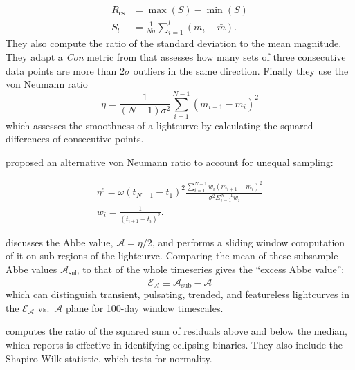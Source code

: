 \documentclass[DM,authoryear,toc]{lsstdoc}
\begin{document}
\begin{equation}
\begin{aligned} R_{\mathrm{cs}} &=\max (S)-\min (S) \\ S_{l} &=\frac{1}{N \sigma} \sum_{i=1}^{l}\left(m_{i}-\bar{m}\right). \end{aligned}
\end{equation}
They also compute the ratio of the standard deviation to the mean magnitude.
They adapt a \textit{Con} metric from \citet{Wozniak:00:Difference-Imag} that assesses how many sets of three consecutive data points are more than 2$\sigma$ outliers in the same direction.
Finally they use the von Neumann ratio
\begin{equation}
\eta=\frac{1}{(N-1) \sigma^{2}} \sum_{i=1}^{N-1}\left(m_{i+1}-m_{i}\right)^{2}
\end{equation}
which assesses the smoothness of a lightcurve by calculating the squared differences of consecutive points.

\citet{Kim:14:The-EPOCH-Proje} proposed an alternative von Neumann ratio to account for unequal sampling:

\begin{equation}
\begin{array}{l}{\eta^{e}=\bar{\omega}\left(t_{N-1}-t_{1}\right)^{2} \frac{\sum_{i=1}^{N-1} w_{i}\left(m_{i+1}-m_{i}\right)^{2}}{\sigma^{2} \Sigma_{i=1}^{N-1} w_{i}}} \\ {w_{i}=\frac{1}{\left(t_{i+1}-t_{i}\right)^{2}}}.\end{array}
\end{equation}

\citet{Mowlavi:14:AbbeValue} discusses the Abbe value, $\mathcal{A} = \eta/2$, and performs a sliding window computation of it on sub-regions of the lightcurve.
Comparing the mean of these subsample Abbe values $\mathcal{A}_{\mathrm{sub}}$ to that of the whole timeseries gives the ``excess Abbe value'':
\begin{equation}
\mathcal{E}_{\mathcal{A}} \equiv \overline{\mathcal{A}_{\mathrm{sub}}}-\mathcal{A}
\end{equation}
which can distinguish transient, pulsating, trended, and featureless lightcurves in the $\mathcal{E}_{\mathcal{A}}$ vs.\ $\mathcal{A}$ plane for 100-day window timescales.


\citet{Kim:16:UPSILoN} computes the ratio of the squared sum of residuals above and below the median, which \citet{Jayasinghe:19:ASASSNVarsIII} reports is effective in identifying eclipsing binaries.
They also include the Shapiro-Wilk statistic, which tests for normality.
\end{document}
